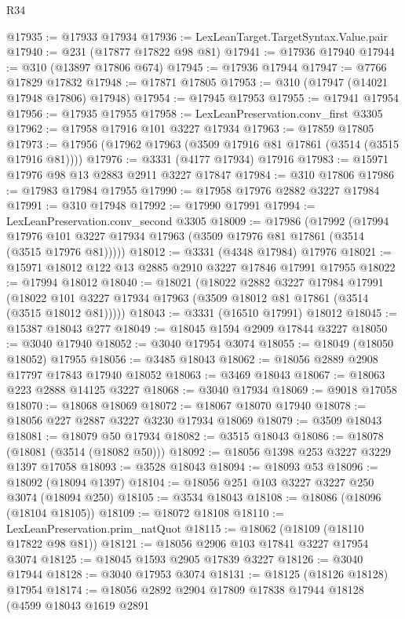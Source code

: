 \begin{lexlean}{R34}
\begin{coremodule}
@17935 := @17933 @17934
@17936 := LexLeanTarget.TargetSyntax.Value.pair
@17940 := @231 (@17877 @17822 @98 @81)
@17941 := @17936 @17940
@17944 := @310 (@13897 @17806 @674)
@17945 := @17936 @17944
@17947 := @7766 @17829 @17832
@17948 := @17871 @17805
@17953 := @310 (@17947 (@14021 @17948 @17806) @17948)
@17954 := @17945 @17953
@17955 := @17941 @17954
@17956 := @17935 @17955
@17958 := LexLeanPreservation.conv_first @3305
@17962 := @17958 @17916 @101 @3227 @17934
@17963 := @17859 @17805
@17973 := @17956 (@17962 @17963 (@3509 @17916 @81 @17861 (@3514 (@3515 @17916 @81))))
@17976 := @3331 (@4177 @17934) @17916
@17983 := @15971 @17976 @98 @13 @2883 @2911 @3227 @17847
@17984 := @310 @17806
@17986 := @17983 @17984 @17955
@17990 := @17958 @17976 @2882 @3227 @17984
@17991 := @310 @17948
@17992 := @17990 @17991
@17994 := LexLeanPreservation.conv_second @3305
@18009 := @17986
    (@17992
      (@17994 @17976 @101 @3227 @17934 @17963 (@3509 @17976 @81 @17861 (@3514 (@3515 @17976 @81)))))
@18012 := @3331 (@4348 @17984) @17976
@18021 := @15971 @18012 @122 @13 @2885 @2910 @3227 @17846 @17991 @17955
@18022 := @17994 @18012
@18040 := @18021
    (@18022
      @2882
      @3227
      @17984
      @17991
      (@18022 @101 @3227 @17934 @17963 (@3509 @18012 @81 @17861 (@3514 (@3515 @18012 @81)))))
@18043 := @3331 (@16510 @17991) @18012
@18045 := @15387 @18043 @277
@18049 := @18045 @1594 @2909 @17844 @3227
@18050 := @3040 @17940
@18052 := @3040 @17954 @3074
@18055 := @18049 (@18050 @18052) @17955
@18056 := @3485 @18043
@18062 := @18056 @2889 @2908 @17797 @17843 @17940 @18052
@18063 := @3469 @18043
@18067 := @18063 @223 @2888 @14125 @3227
@18068 := @3040 @17934
@18069 := @9018 @17058
@18070 := @18068 @18069
@18072 := @18067 @18070 @17940
@18078 := @18056 @227 @2887 @3227 @3230 @17934 @18069
@18079 := @3509 @18043
@18081 := @18079 @50 @17934
@18082 := @3515 @18043
@18086 := @18078 (@18081 (@3514 (@18082 @50)))
@18092 := @18056 @1398 @253 @3227 @3229 @1397 @17058
@18093 := @3528 @18043
@18094 := @18093 @53
@18096 := @18092 (@18094 @1397)
@18104 := @18056 @251 @103 @3227 @3227 @250 @3074 (@18094 @250)
@18105 := @3534 @18043
@18108 := @18086 (@18096 (@18104 @18105))
@18109 := @18072 @18108
@18110 := LexLeanPreservation.prim_natQuot
@18115 := @18062 (@18109 (@18110 @17822 @98 @81))
@18121 := @18056 @2906 @103 @17841 @3227 @17954 @3074
@18125 := @18045 @1593 @2905 @17839 @3227
@18126 := @3040 @17944
@18128 := @3040 @17953 @3074
@18131 := @18125 (@18126 @18128) @17954
@18174 := @18056
    @2892
    @2904
    @17809
    @17838
    @17944
    @18128
    (@4599
      @18043
      @1619
      @2891

\end{coremodule}
\end{lexlean}

